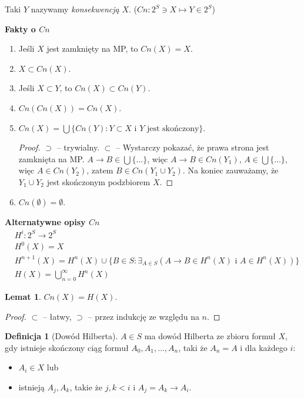 \documentclass[10pt,a4paper]{article}
\theoremstyle{plain}
\newtheorem{lemma}{Lemat}
\theoremstyle{definition}
\newtheorem*{definition}{Definicja}
\newcommand{\impl}{\rightarrow}
\newcommand{\header}[1]{\noindent\textbf{#1}}
\begin{document}
Taki $Y$ nazywamy \emph{konsekwencją} $X$. ($Cn: 2^S \ni X \mapsto Y \in 2^S$)

\bigskip

\header{Fakty o $Cn$}

\begin{enumerate}
  \item Jeśli $X$ jest zamknięty na MP, to $Cn(X) = X$.
  \item $X \subset Cn(X)$.
  \item Jeśli $X \subset Y$, to $Cn(X) \subset Cn(Y)$.
  \item $Cn(Cn(X)) = Cn(X)$.
  \item $Cn(X) = \bigcup\{
    Cn(Y) : Y \subset X \text{ i } Y \text{ jest skończony}
  \}$.
    \begin{proof}
      $\supset$ -- trywialny. $\subset$ -- Wystarczy pokazać, że prawa strona
      jest zamknięta na MP. $A \impl B \in \bigcup \{ \ldots \}$, więc
      $A \impl B \in Cn(Y_1)$, $A \in \bigcup \{ \ldots \}$, więc
      $A \in Cn(Y_2)$, zatem $B \in Cn(Y_1 \cup Y_2)$.
      Na koniec zauważamy, że $Y_1 \cup Y_2$ jest skończonym podzbiorem $X$.
    \end{proof}
  \item $Cn(\emptyset) = \emptyset$.
\end{enumerate}

\bigskip

\header{Alternatywne opisy $Cn$}
\begin{align*}
& H^i: 2^S \to 2^S\\
& H^0(X) = X\\
& H^{n+1}(X) = H^n(X) \cup \{
    B \in S : \exists_{A \in S} (A \impl B \in H^n(X) \text{ i } A \in H^n(X))
  \}\\
& H(X) = \bigcup_{n = 0}^\infty H^n(X)
\end{align*}

\begin{lemma}
$Cn(X) = H(X).$
\end{lemma}

\begin{proof}
$\subset$ -- łatwy, $\supset$ -- przez indukcję ze względu na $n$.
\end{proof}

\begin{definition}[Dowód Hilberta]
$A \in S$ ma dowód Hilberta ze zbioru formuł $X$, gdy istnieje skończony ciąg
formuł $A_0, A_1, \ldots, A_n$, taki że $A_n = A$ i dla każdego $i$:
\begin{itemize}
  \item $A_i \in X$ lub
  \item istnieją $A_j, A_k$, takie że $j, k < i$ i $A_j = A_k \impl A_i$.
\end{itemize}
\end{definition}
\end{document}
